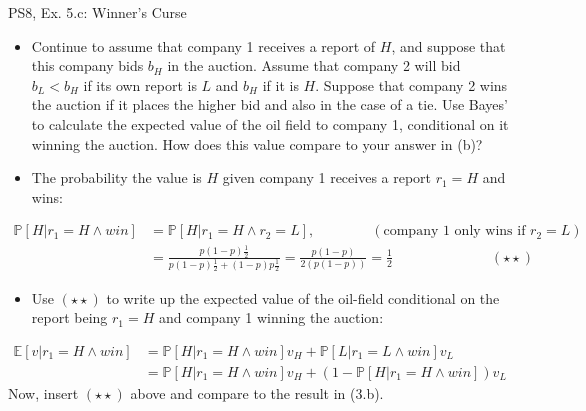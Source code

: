 \begin{frame}{PS8, Ex. 5.c: Winner's Curse}
      \begin{itemize}
        \item[(c)] Continue to assume that company 1 receives a report of $H$, and suppose that this company bids $b_H$ in the auction. Assume that company 2 will bid $b_L < b_H$ if its own report is $L$ and $b_H$ if it is $H$. Suppose that company 2 wins the auction if it places the higher bid and also in the case of a tie. Use Bayes’ to calculate the expected value of the oil field to company 1, conditional on it winning the auction. How does this value compare to your answer in (b)?
        \item[Step 1:] The probability the value is $H$ given company 1 receives a report $r_1=H$ and wins:
        \end{itemize}
        \vspace{-8pt}
        \begin{align*}
          \mathbb{P}[H|r_1=H\wedge win]&=\mathbb{P}[H|r_1=H\wedge r_2=L],\quad\quad\quad\quad(\text{company 1 only wins if }r_2=L)\\
            &=\frac{p(1-p)\frac{1}{2}}{p(1-p)\frac{1}{2}+(1-p)p\frac{1}{2}}=\frac{p(1-p)}{2(p(1-p))}=\frac{1}{2}\quad\quad\quad\quad\quad\quad\quad(\star\star)
        \end{align*}
        \vspace{-8pt}
        \begin{itemize}
        \item[Step 2:] Use $(\star\star)$ to write up the expected value of the oil-field conditional on the report being $r_1=H$ and company 1 winning the auction:
      \end{itemize}
      \vspace{-4pt}
      \begin{align*}
        \mathbb{E}[v|r_1=H\wedge win]&=\mathbb{P}[H|r_1=H\wedge win]v_H+\mathbb{P}[L|r_1=L\wedge win]v_L\\
        &=\mathbb{P}[H|r_1=H\wedge win]v_H+\left(1-\mathbb{P}[H|r_1=H\wedge win]\right)v_L
      \end{align*}
      Now, insert $(\star\star)$ above and compare to the result in (3.b).
      \vfill\null
\end{frame}
